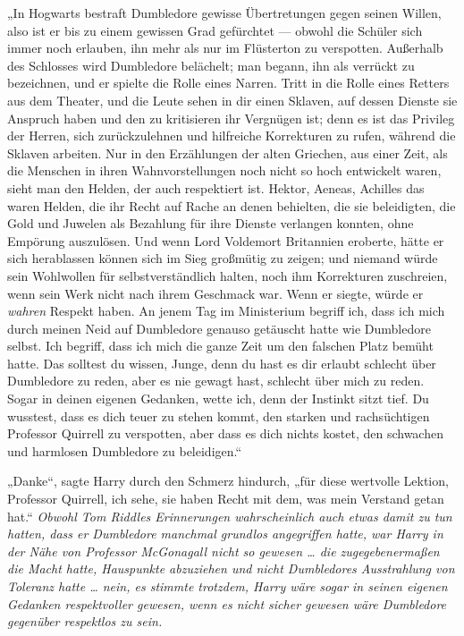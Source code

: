 „In Hogwarts bestraft Dumbledore gewisse Übertretungen gegen seinen Willen, also ist er bis zu einem gewissen Grad gefürchtet — obwohl die Schüler sich immer noch erlauben, ihn mehr als nur im Flüsterton zu verspotten. Außerhalb des Schlosses wird Dumbledore belächelt; man begann, ihn als verrückt zu bezeichnen, und er spielte die Rolle eines Narren. Tritt in die Rolle eines Retters aus dem Theater, und die Leute sehen in dir einen Sklaven, auf dessen Dienste sie Anspruch haben und den zu kritisieren ihr Vergnügen ist; denn es ist das Privileg der Herren, sich zurückzulehnen und hilfreiche Korrekturen zu rufen, während die Sklaven arbeiten. Nur in den Erzählungen der alten Griechen, aus einer Zeit, als die Menschen in ihren Wahnvorstellungen noch nicht so hoch entwickelt waren, sieht man den Helden, der auch respektiert ist. Hektor, Aeneas, Achilles das waren Helden, die ihr Recht auf Rache an denen behielten, die sie beleidigten, die Gold und Juwelen als Bezahlung für ihre Dienste verlangen konnten, ohne Empörung auszulösen. Und wenn Lord Voldemort Britannien eroberte, hätte er sich herablassen können sich im Sieg großmütig zu zeigen; und niemand würde sein Wohlwollen für selbstverständlich halten, noch ihm Korrekturen zuschreien, wenn sein Werk nicht nach ihrem Geschmack war. Wenn er siegte, würde er \emph{wahren} Respekt haben. An jenem Tag im Ministerium begriff ich, dass ich mich durch meinen Neid auf Dumbledore genauso getäuscht hatte wie Dumbledore selbst. Ich begriff, dass ich mich die ganze Zeit um den falschen Platz bemüht hatte. Das solltest du wissen, Junge, denn du hast es dir erlaubt schlecht über Dumbledore zu reden, aber es nie gewagt hast, schlecht über mich zu reden. Sogar in deinen eigenen Gedanken, wette ich, denn der Instinkt sitzt tief. Du wusstest, dass es dich teuer zu stehen kommt, den starken und rachsüchtigen Professor Quirrell zu verspotten, aber dass es dich nichts kostet, den schwachen und harmlosen Dumbledore zu beleidigen.“

„Danke“, sagte Harry durch den Schmerz hindurch, „für diese wertvolle Lektion, Professor Quirrell, ich sehe, sie haben Recht mit dem, was mein Verstand getan hat.“
\emph{Obwohl Tom Riddles Erinnerungen wahrscheinlich auch etwas damit zu tun hatten, dass er Dumbledore manchmal grundlos angegriffen hatte, war Harry in der Nähe von Professor McGonagall nicht so gewesen … die zugegebenermaßen die Macht hatte, Hauspunkte abzuziehen und nicht Dumbledores Ausstrahlung von Toleranz hatte … nein, es stimmte trotzdem, Harry wäre sogar in seinen eigenen Gedanken respektvoller gewesen, wenn es nicht \emph{sicher} gewesen wäre Dumbledore gegenüber respektlos zu sein.}

